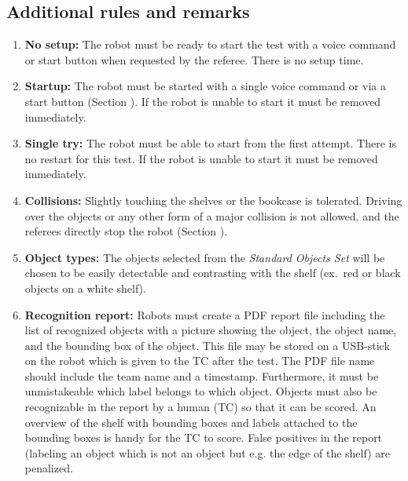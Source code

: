 \subsection{Additional rules and remarks}
\begin{enumerate}
\item \textbf{No setup:} The robot must be ready to start the test with a voice command or start button when requested by the referee. There is no setup time.
\item \textbf{Startup:} The robot must be started with a single voice command or via a start button (Section ). If the robot is unable to start it must be removed immediately.
\item \textbf{Single try:} The robot must be able to start from the first attempt. There is no restart for this test. If the robot is unable to start it must be removed immediately.
\item \textbf{Collisions:} Slightly touching the shelves or the bookcase is tolerated. Driving over the objects or any other form of a major collision is not allowed, and the referees directly stop the robot (Section ).
\item \textbf{Object types:} The objects selected from the \textit{Standard Objects Set} will be chosen to be easily detectable and contrasting with the shelf (ex.~red or black objects on a white shelf).
\item \textbf{Recognition report:} Robots must create a PDF report file including the list of recognized objects with a picture showing the object, the object name, and the bounding box of the object.
  This file may be stored on a USB-stick on the robot which is given to the TC after the test. The PDF file name should include the team name and a timestamp. 
  Furthermore, it must be unmistakeable which label belongs to which object. Objects must also be recognizable in the report by a human (TC) so that it can be scored. 
  An overview of the shelf with bounding boxes and labels attached to the bounding boxes is handy for the TC to score. 
  False positives in the report (labeling an object which is not an object but e.g. the edge of the shelf) are penalized.
\end{enumerate}

